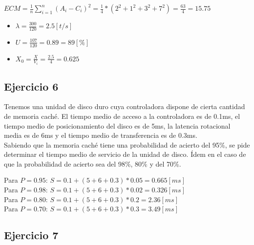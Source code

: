 \begin{enumerate}
    \begin{tcolorbox}[colback=white,colframe=cyan!50!black,fonttitle=\bfseries]
    $ECM = \frac{1}{n}\sum_{i=1}^{n}(A_i - C_i)^2 = \frac{1}{4}*(2^2 + 1^2 + 3^2 + 7^2) = \frac{63}{4}=15.75$
    \begin{itemize}
        \item $\lambda = \frac{300}{120} = 2.5[t/s]$
        \item $U = \frac{107}{120} = 0.89=89[\%]$
        \item $X_0 = \frac{X}{V_i} = \frac{2.5}{4} = 0.625$
    \end{itemize}
    \end{tcolorbox}
\end{enumerate}


\subsection{Ejercicio 6}

Tenemos una unidad de disco duro cuya controladora dispone de cierta cantidad de memoria caché. El tiempo medio de acceso a la controladora es de 0.1ms, el tiempo medio de posicionamiento del disco es de 5ms, la latencia rotacional media es de 6ms y el tiempo medio de transferencia es de 0.3ms.\\

Sabiendo que la memoria caché tiene una probabilidad de acierto del 95\%, se pide determinar el tiempo medio de servicio de la unidad de disco. Ídem en el caso de que la probabilidad de acierto sea del 98\%, 80\% y del 70\%.\\
\begin{tcolorbox}[colback=white,colframe=cyan!50!black,fonttitle=\bfseries]
Para $P=0.95$: $S = 0.1+(5+6+0.3)*0.05=0.665[ms]$\\
Para $P=0.98$: $S = 0.1+(5+6+0.3)*0.02=0.326[ms]$\\
Para $P=0.80$: $S = 0.1+(5+6+0.3)*0.2=2.36[ms]$\\
Para $P=0.70$: $S = 0.1+(5+6+0.3)*0.3=3.49[ms]$
\end{tcolorbox}
\subsection{Ejercicio 7}

